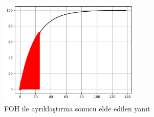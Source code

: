 \begin{figure}[!htb]
    \centering
    \includegraphics[width=0.6\textwidth]{q2.pdf}
    \caption{FOH ile ayrıklaştırma sonucu elde edilen yanıt}\label{fig:q2}
\end{figure}

